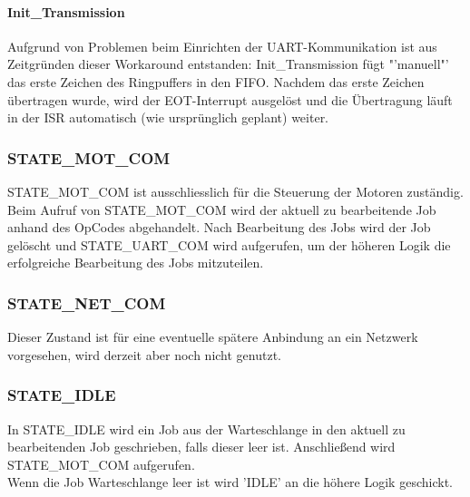 \documentclass{scrartcl}
\begin{document}
\paragraph{Init\_Transmission}
Aufgrund von Problemen beim Einrichten der UART-Kommunikation ist aus Zeitgründen dieser Workaround entstanden: Init\_Transmission fügt "'manuell"' das erste Zeichen des Ringpuffers in den FIFO. Nachdem das erste Zeichen übertragen wurde, wird der EOT-Interrupt ausgelöst und die Übertragung läuft in der ISR automatisch (wie ursprünglich geplant) weiter.

\subsubsection{STATE\_MOT\_COM}
STATE\_MOT\_COM ist ausschliesslich für die Steuerung der Motoren zuständig. Beim Aufruf von STATE\_MOT\_COM wird der aktuell zu bearbeitende Job anhand des OpCodes abgehandelt. Nach Bearbeitung des Jobs wird der Job gelöscht und STATE\_UART\_COM wird aufgerufen, um der höheren Logik die erfolgreiche Bearbeitung des Jobs mitzuteilen.

\subsubsection{STATE\_NET\_COM}
Dieser Zustand ist für eine eventuelle spätere Anbindung an ein Netzwerk vorgesehen, wird derzeit aber noch nicht genutzt.

\subsubsection{STATE\_IDLE}
In STATE\_IDLE wird ein Job aus der Warteschlange in den aktuell zu bearbeitenden Job geschrieben, falls dieser leer ist. Anschließend wird STATE\_MOT\_COM aufgerufen. \\
Wenn die Job Warteschlange leer ist wird 'IDLE' an die höhere Logik geschickt.
\end{document}
